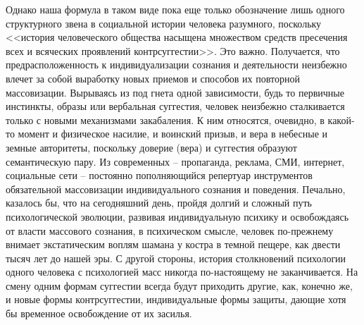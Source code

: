 Однако наша формула в таком виде пока еще только обозначение лишь одного
структурного звена в социальной истории человека разумного, поскольку
<<история человеческого общества насыщена множеством средств пресечения всех и
всяческих проявлений контрсуггестии>>.\autocite{porshnev1974} Это важно.
Получается, что предрасположенность к индивидуализации сознания и деятельности
неизбежно влечет за собой выработку новых приемов и способов их повторной
массовизации. Вырываясь из под гнета одной зависимости, будь то первичные
инстинкты, образы или вербальная суггестия, человек неизбежно сталкивается
только с новыми механизмами закабаления. К ним относятся, очевидно, в какой-то
момент и физическое насилие, и воинский призыв, и вера в небесные и земные
авторитеты, поскольку доверие (вера) и суггестия образуют семантическую пару.
Из современных -- пропаганда, реклама, СМИ, интернет, социальные сети -- постоянно
пополняющийся репертуар инструментов обязательной массовизации индивидуального
сознания и поведения. Печально, казалось бы, что на сегодняшний день, пройдя
долгий и сложный путь психологической эволюции, развивая индивидуальную психику
и освобождаясь от власти массового сознания, в психическом смысле, человек
по-прежнему внимает экстатическим воплям шамана у костра в темной пещере,
как двести тысяч лет до нашей эры. С другой стороны, история столкновений
психологии одного человека с психологией масс никогда по-настоящему не
заканчивается. На смену одним формам суггестии всегда будут приходить другие,
как, конечно же, и новые формы контрсуггестии, индивидуальные формы защиты,
дающие хотя бы временное освобождение от их засилья.

